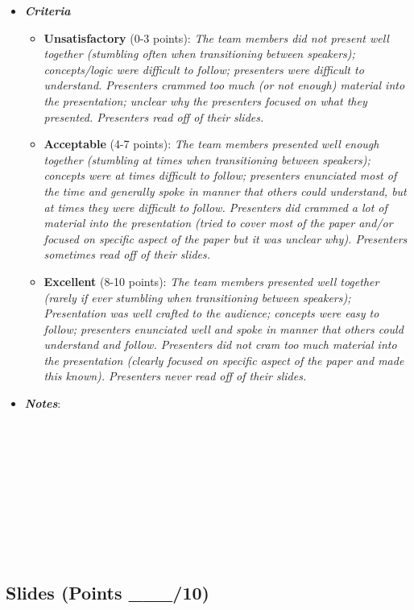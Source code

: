 \documentclass[
]{article}
\providecommand{\tightlist}{%
  \setlength{\itemsep}{0pt}\setlength{\parskip}{0pt}}
\begin{document}
\begin{itemize}
\tightlist
\item
  \textbf{\emph{Criteria}}

  \begin{itemize}
  \tightlist
  \item
    \textbf{Unsatisfactory} (0-3 points): \emph{The team members did not
    present well together (stumbling often when transitioning between
    speakers); concepts/logic were difficult to follow; presenters were
    difficult to understand. Presenters crammed too much (or not enough)
    material into the presentation; unclear why the presenters focused
    on what they presented. Presenters read off of their slides.}
  \item
    \textbf{Acceptable} (4-7 points): \emph{The team members presented
    well enough together (stumbling at times when transitioning between
    speakers); concepts were at times difficult to follow; presenters
    enunciated most of the time and generally spoke in manner that
    others could understand, but at times they were difficult to follow.
    Presenters did crammed a lot of material into the presentation
    (tried to cover most of the paper and/or focused on specific aspect
    of the paper but it was unclear why). Presenters sometimes read off
    of their slides.}
  \item
    \textbf{Excellent} (8-10 points): \emph{The team members presented
    well together (rarely if ever stumbling when transitioning between
    speakers); Presentation was well crafted to the audience; concepts
    were easy to follow; presenters enunciated well and spoke in manner
    that others could understand and follow. Presenters did not cram too
    much material into the presentation (clearly focused on specific
    aspect of the paper and made this known). Presenters never read off
    of their slides.}
  \end{itemize}
\item
  \textbf{\emph{Notes}}:
\end{itemize}

\begin{verbatim}
  
  
  
  
  
  
  
  
  
  
\end{verbatim}

\hypertarget{slides-points-___10}{%
\subsection{Slides (Points \_\_\_/10)}\label{slides-points-___10}}
\end{document}
